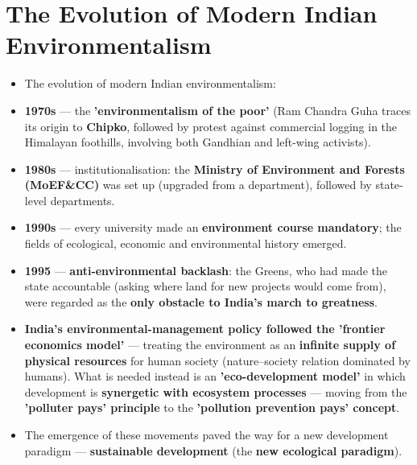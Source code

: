 \section{The Evolution of Modern Indian Environmentalism}

\begin{KeyConcept}
\begin{itemize}
\item The evolution of modern Indian environmentalism:
\item \textbf{1970s} --- the \textbf{'environmentalism of the poor'} (Ram Chandra Guha traces its origin to \textbf{Chipko}, followed by protest against commercial logging in the Himalayan foothills, involving both Gandhian and left-wing activists).
\item \textbf{1980s} --- institutionalisation: the \textbf{Ministry of Environment and Forests (MoEF\&CC)} was set up (upgraded from a department), followed by state-level departments.
\item \textbf{1990s} --- every university made an \textbf{environment course mandatory}; the fields of ecological, economic and environmental history emerged.
\item \textbf{1995} --- \textbf{anti-environmental backlash}: the Greens, who had made the state accountable (asking where land for new projects would come from), were regarded as the \textbf{only obstacle to India's march to greatness}.
\end{itemize}
\end{KeyConcept}

\begin{KeyConcept}
\begin{itemize}
\item \textbf{India's environmental-management policy followed the 'frontier economics model'} --- treating the environment as an \textbf{infinite supply of physical resources} for human society (nature--society relation dominated by humans). What is needed instead is an \textbf{'eco-development model'} in which development is \textbf{synergetic with ecosystem processes} --- moving from the \textbf{'polluter pays' principle} to the \textbf{'pollution prevention pays' concept}.
\item The emergence of these movements paved the way for a new development paradigm --- \textbf{sustainable development} (the \textbf{new ecological paradigm}).
\end{itemize}
\end{KeyConcept}

